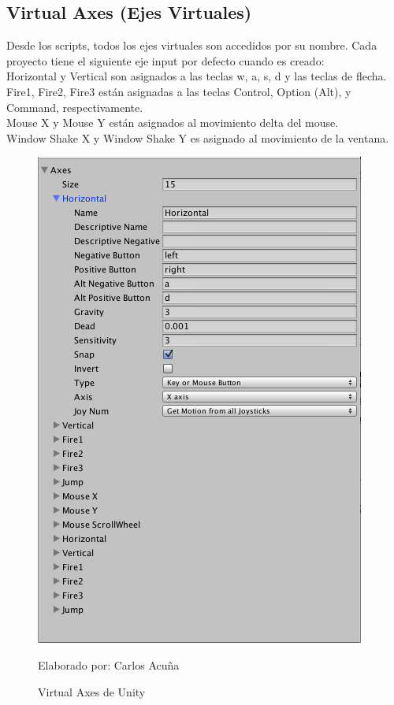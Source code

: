 \documentclass[a4paper, openright, 12pt]{report}
\begin{document}
\subsection*{Virtual Axes (Ejes Virtuales)}
\justify
Desde los scripts, todos los ejes virtuales son accedidos por su nombre.
Cada proyecto tiene el siguiente eje input por defecto cuando es creado:\\
Horizontal y Vertical son asignados a las teclas w, a, s, d y las teclas de flecha.\\
Fire1, Fire2, Fire3 están asignadas a las teclas Control, Option (Alt), y Command, respectivamente.\\
Mouse X y Mouse Y están asignados al movimiento delta del mouse.\\
Window Shake X y Window Shake Y es asignado al movimiento de la ventana.\\

\begin{figure}[h]
\captionsetup{justification=centering,margin=2cm}
\includegraphics[scale=0.5]{unity10}
\centering
\caption{Virtual Axes de Unity}
Elaborado por: Carlos Acuña
\label{fig:unity10}
\end{figure}
\end{document}
